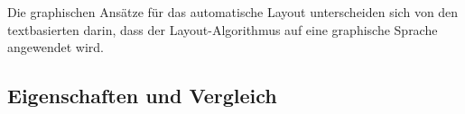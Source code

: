 Die graphischen Ansätze für das automatische Layout unterscheiden sich von den textbasierten darin, dass der Layout-Algorithmus auf eine graphische Sprache angewendet wird.










\subsection{Eigenschaften und Vergleich}







